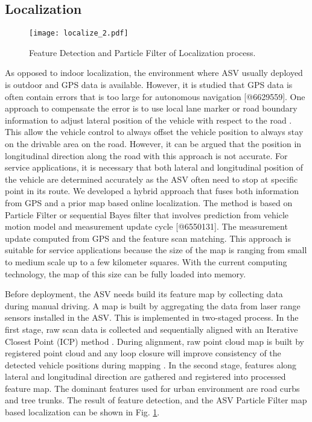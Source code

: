 \documentclass[10 pt,a4paper,conference]{IEEEtran}
\begin{document}
\subsection{Localization}\label{localization}

\begin{figure}[!t]
\centering
\texttt{[image: localize\_2.pdf]}
\caption{Feature Detection and Particle Filter of Localization process.}
\label{fig_localize}
\end{figure}

As opposed to indoor localization, the environment where ASV usually
deployed is outdoor and GPS data is available. However, it is studied
that GPS data is often contain errors that is too large for autonomous
navigation {[}@6629559{]}. One approach to compensate the error is to
use local lane marker or road boundary information to adjust lateral
position of the vehicle with respect to the road \citep{loc_Boss}. This
allow the vehicle control to always offset the vehicle position to
always stay on the drivable area on the road. However, it can be argued
that the position in longitudinal direction along the road with this
approach is not accurate. For service applications, it is necessary that
both lateral and longitudinal position of the vehicle are determined
accurately as the ASV often need to stop at specific point in its route.
We developed a hybrid approach that fuses both information from GPS and
a prior map based online localization. The method is based on Particle
Filter or sequential Bayes filter that involves prediction from vehicle
motion model and measurement update cycle {[}@6550131{]}. The
measurement update computed from GPS and the feature scan matching. This
approach is suitable for service applications because the size of the
map is ranging from small to medium scale up to a few kilometer squares.
With the current computing technology, the map of this size can be fully
loaded into memory.

Before deployment, the ASV needs build its feature map by collecting
data during manual driving. A map is built by aggregating the data from
laser range sensors installed in the ASV. This is implemented in
two-staged process. In the first stage, raw scan data is collected and
sequentially aligned with an Iterative Closest Point (ICP) method
\citep{censi08plicp}. During alignment, raw point cloud map is built by
registered point cloud and any loop closure will improve consistency of
the detected vehicle positions during mapping \citep{tiar2015fast}. In
the second stage, features along lateral and longitudinal direction are
gathered and registered into processed feature map. The dominant
features used for urban environment are road curbs and tree trunks. The
result of feature detection, and the ASV Particle Filter map based
localization can be shown in Fig. \ref{fig_localize}.
\end{document}
